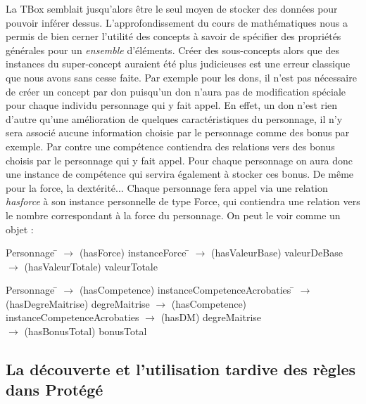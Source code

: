 \par La TBox semblait jusqu'alors être le seul moyen de stocker des données pour pouvoir inférer dessus. L'approfondissement du cours de mathématiques nous a permis de bien cerner l'utilité des concepts à savoir de spécifier des propriétés générales pour un \emph{ensemble} d'éléments. Créer des sous-concepts alors que des instances du super-concept auraient été plus judicieuses est une erreur classique que nous avons sans cesse faite. Par exemple pour les dons, il n'est pas nécessaire de créer un concept par don puisqu'un don n'aura pas de modification spéciale pour chaque individu personnage qui y fait appel. En effet, un don n'est rien d'autre qu'une amélioration de quelques caractéristiques du personnage, il n'y sera associé aucune information choisie par le personnage comme des bonus par exemple.  Par contre une compétence contiendra des relations vers des bonus choisis par le personnage qui y fait appel. Pour chaque personnage on aura donc une instance de compétence qui servira également à stocker ces bonus. De même pour la force, la dextérité... Chaque personnage fera appel via une relation \emph{hasforce} à son instance personnelle de type Force, qui contiendra une relation vers le nombre correspondant à la force du personnage. On peut le voir comme un objet :
\begin{tabbing}
  Personnage \= $\rightarrow$ (hasForce)  instanceForce  \= $\rightarrow$ (hasValeurBase)  valeurDeBase \\
  \> \> $\rightarrow$ (hasValeurTotale)  valeurTotale 
  \end{tabbing}
  
  \begin{tabbing}
    Personnage \= $\rightarrow$ (hasCompetence)  instanceCompetenceAcrobaties   \= $\rightarrow$  (hasDegreMaitrise)  degreMaitrise \kill
 \> $\rightarrow$  (hasCompetence)  instanceCompetenceAcrobaties   \> $\rightarrow$  (hasDM)  degreMaitrise \\
 \>  \> $\rightarrow$  (hasBonusTotal)  bonusTotal
\end{tabbing}

\subsection{La découverte et l'utilisation tardive des règles dans Protégé}
\label{sec:la-decouverte-et}

